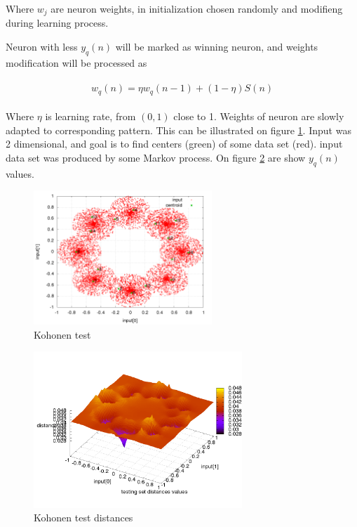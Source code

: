 \documentclass[twoside]{oss-conf-eng}
\begin{document}
Where $w_j$ are neuron weights, in initialization chosen randomly
 and modifieng during learning process.

Neuron with less $y_q(n)$ will be marked as winning neuron, and weights modification
will be processed as

\begin{eqnarray}
\begin{split}
\label{neuron_transfer}
w_q(n) = \eta w_q(n-1) + (1 - \eta)S(n)
\end{split}
\end{eqnarray}

Where $\eta$ is learning rate, from $(0, 1)$ close to 1. Weights of neuron are slowly adapted
to corresponding pattern. This can be illustrated on figure \ref{fig:kohonen_test_01}. Input was
2 dimensional, and goal is to find centers (green) of some data set (red). input
data set was produced by some Markov process. On figure \ref{fig:kohonen_test_02} are
show $y_q(n)$ values.

\begin{figure}[]
    \centering
    \includegraphics[width=0.6\textwidth]{kohonen_test/learing_result.png}
    \caption{Kohonen test}
    \label{fig:kohonen_test_01}
\end{figure}

\begin{figure}[]
    \centering
    \includegraphics[width=0.7\textwidth]{kohonen_test/distances_result.png}
    \caption{Kohonen test distances}
    \label{fig:kohonen_test_02}
\end{figure}
\end{document}
